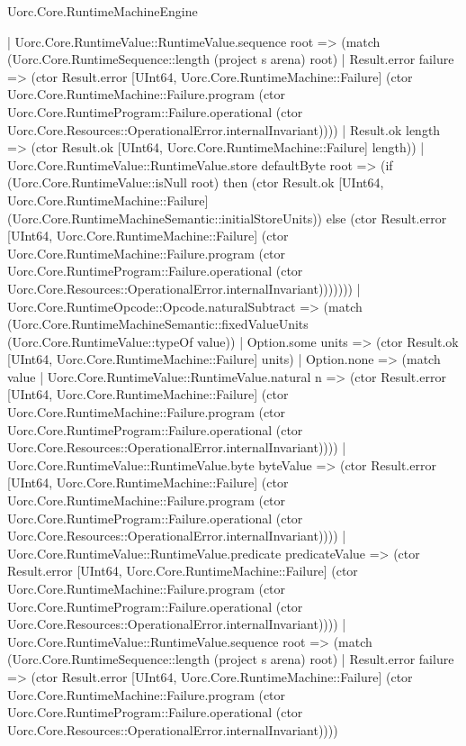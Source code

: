 \begin{lexlean}{Uorc.Core.RuntimeMachineEngine}
\begin{semanticmodule}
{              | Uorc.Core.RuntimeValue::RuntimeValue.sequence root => (match (Uorc.Core.RuntimeSequence::length (project s arena) root)
                | Result.error failure => (ctor Result.error [UInt64, Uorc.Core.RuntimeMachine::Failure] (ctor Uorc.Core.RuntimeMachine::Failure.program (ctor Uorc.Core.RuntimeProgram::Failure.operational (ctor Uorc.Core.Resources::OperationalError.internalInvariant))))
                | Result.ok length => (ctor Result.ok [UInt64, Uorc.Core.RuntimeMachine::Failure] length))
              | Uorc.Core.RuntimeValue::RuntimeValue.store defaultByte root => (if (Uorc.Core.RuntimeValue::isNull root) then (ctor Result.ok [UInt64, Uorc.Core.RuntimeMachine::Failure] (Uorc.Core.RuntimeMachineSemantic::initialStoreUnits)) else (ctor Result.error [UInt64, Uorc.Core.RuntimeMachine::Failure] (ctor Uorc.Core.RuntimeMachine::Failure.program (ctor Uorc.Core.RuntimeProgram::Failure.operational (ctor Uorc.Core.Resources::OperationalError.internalInvariant)))))))
          | Uorc.Core.RuntimeOpcode::Opcode.naturalSubtract => (match (Uorc.Core.RuntimeMachineSemantic::fixedValueUnits (Uorc.Core.RuntimeValue::typeOf value))
            | Option.some units => (ctor Result.ok [UInt64, Uorc.Core.RuntimeMachine::Failure] units)
            | Option.none => (match value
              | Uorc.Core.RuntimeValue::RuntimeValue.natural n => (ctor Result.error [UInt64, Uorc.Core.RuntimeMachine::Failure] (ctor Uorc.Core.RuntimeMachine::Failure.program (ctor Uorc.Core.RuntimeProgram::Failure.operational (ctor Uorc.Core.Resources::OperationalError.internalInvariant))))
              | Uorc.Core.RuntimeValue::RuntimeValue.byte byteValue => (ctor Result.error [UInt64, Uorc.Core.RuntimeMachine::Failure] (ctor Uorc.Core.RuntimeMachine::Failure.program (ctor Uorc.Core.RuntimeProgram::Failure.operational (ctor Uorc.Core.Resources::OperationalError.internalInvariant))))
              | Uorc.Core.RuntimeValue::RuntimeValue.predicate predicateValue => (ctor Result.error [UInt64, Uorc.Core.RuntimeMachine::Failure] (ctor Uorc.Core.RuntimeMachine::Failure.program (ctor Uorc.Core.RuntimeProgram::Failure.operational (ctor Uorc.Core.Resources::OperationalError.internalInvariant))))
              | Uorc.Core.RuntimeValue::RuntimeValue.sequence root => (match (Uorc.Core.RuntimeSequence::length (project s arena) root)
                | Result.error failure => (ctor Result.error [UInt64, Uorc.Core.RuntimeMachine::Failure] (ctor Uorc.Core.RuntimeMachine::Failure.program (ctor Uorc.Core.RuntimeProgram::Failure.operational (ctor Uorc.Core.Resources::OperationalError.internalInvariant))))
}
\end{semanticmodule}
\end{lexlean}
